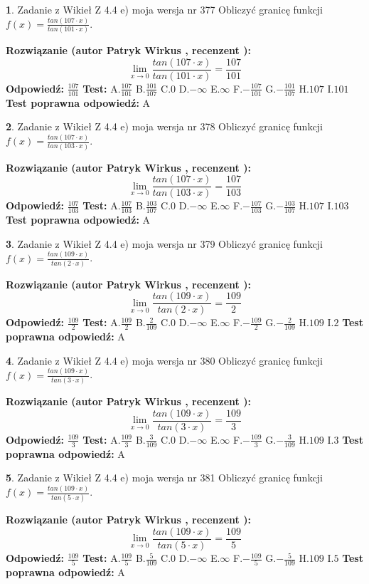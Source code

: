 \documentclass[12pt, a4paper]{article}
\theoremstyle{definition} %
\newtheorem{zad}{}
\newcommand{\zadStart}[1]{\begin{zad}#1\newline}
\newcommand{\zadStop}{\end{zad}}
\newcommand{\rozwStart}[2]{\noindent \textbf{Rozwiązanie (autor #1 , recenzent #2): }\newline}
\newcommand{\rozwStop}{\newline}
\newcommand{\odpStart}{\noindent \textbf{Odpowiedź:}\newline}
\newcommand{\odpStop}{\newline}
\newcommand{\testStart}{\noindent \textbf{Test:}\newline}
\newcommand{\testStop}{\newline}
\newcommand{\kluczStart}{\noindent \textbf{Test poprawna odpowiedź:}\newline}
\newcommand{\kluczStop}{\newline}
\begin{document}
\zadStart{Zadanie z Wikieł Z 4.4 e) moja wersja nr 377}
Obliczyć granicę funkcji $f(x)=\frac{tan(107\cdot x)}{tan(101\cdot x)}$.
\zadStop
\rozwStart{Patryk Wirkus}{}
$$\lim\limits_{x\to 0}\frac{tan(107\cdot x)}{tan(101\cdot x)}=
\frac{107}{101}$$
\rozwStop
\odpStart
$\frac{107}{101}$
\odpStop
\testStart
A.$\frac{107}{101}$
B.$\frac{101}{107}$
C.$0$
D.$-\infty$
E.$\infty$
F.$-\frac{107}{101}$
G.$-\frac{101}{107}$
H.$107$
I.$101$
\testStop
\kluczStart
A
\kluczStop



\zadStart{Zadanie z Wikieł Z 4.4 e) moja wersja nr 378}
Obliczyć granicę funkcji $f(x)=\frac{tan(107\cdot x)}{tan(103\cdot x)}$.
\zadStop
\rozwStart{Patryk Wirkus}{}
$$\lim\limits_{x\to 0}\frac{tan(107\cdot x)}{tan(103\cdot x)}=
\frac{107}{103}$$
\rozwStop
\odpStart
$\frac{107}{103}$
\odpStop
\testStart
A.$\frac{107}{103}$
B.$\frac{103}{107}$
C.$0$
D.$-\infty$
E.$\infty$
F.$-\frac{107}{103}$
G.$-\frac{103}{107}$
H.$107$
I.$103$
\testStop
\kluczStart
A
\kluczStop



\zadStart{Zadanie z Wikieł Z 4.4 e) moja wersja nr 379}
Obliczyć granicę funkcji $f(x)=\frac{tan(109\cdot x)}{tan(2\cdot x)}$.
\zadStop
\rozwStart{Patryk Wirkus}{}
$$\lim\limits_{x\to 0}\frac{tan(109\cdot x)}{tan(2\cdot x)}=
\frac{109}{2}$$
\rozwStop
\odpStart
$\frac{109}{2}$
\odpStop
\testStart
A.$\frac{109}{2}$
B.$\frac{2}{109}$
C.$0$
D.$-\infty$
E.$\infty$
F.$-\frac{109}{2}$
G.$-\frac{2}{109}$
H.$109$
I.$2$
\testStop
\kluczStart
A
\kluczStop



\zadStart{Zadanie z Wikieł Z 4.4 e) moja wersja nr 380}
Obliczyć granicę funkcji $f(x)=\frac{tan(109\cdot x)}{tan(3\cdot x)}$.
\zadStop
\rozwStart{Patryk Wirkus}{}
$$\lim\limits_{x\to 0}\frac{tan(109\cdot x)}{tan(3\cdot x)}=
\frac{109}{3}$$
\rozwStop
\odpStart
$\frac{109}{3}$
\odpStop
\testStart
A.$\frac{109}{3}$
B.$\frac{3}{109}$
C.$0$
D.$-\infty$
E.$\infty$
F.$-\frac{109}{3}$
G.$-\frac{3}{109}$
H.$109$
I.$3$
\testStop
\kluczStart
A
\kluczStop



\zadStart{Zadanie z Wikieł Z 4.4 e) moja wersja nr 381}
Obliczyć granicę funkcji $f(x)=\frac{tan(109\cdot x)}{tan(5\cdot x)}$.
\zadStop
\rozwStart{Patryk Wirkus}{}
$$\lim\limits_{x\to 0}\frac{tan(109\cdot x)}{tan(5\cdot x)}=
\frac{109}{5}$$
\rozwStop
\odpStart
$\frac{109}{5}$
\odpStop
\testStart
A.$\frac{109}{5}$
B.$\frac{5}{109}$
C.$0$
D.$-\infty$
E.$\infty$
F.$-\frac{109}{5}$
G.$-\frac{5}{109}$
H.$109$
I.$5$
\testStop
\kluczStart
A
\kluczStop
\end{document}
